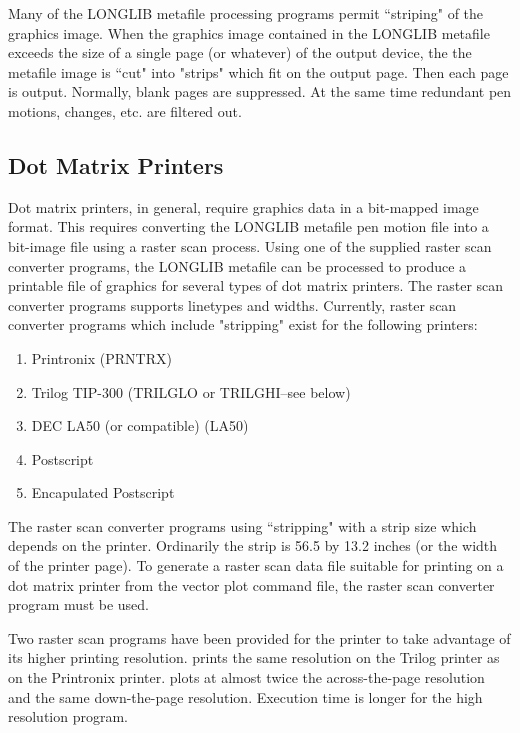 \documentclass[11pt]{report}
\begin{document}
Many of the LONGLIB metafile processing programs permit ``striping" of
the graphics image.  When the graphics image contained in the LONGLIB
metafile exceeds the size of a single page (or whatever) of the output
device, the the metafile image is ``cut" into "strips" which fit on
the output page.  Then each page is output.  Normally, blank pages are
suppressed.  At the same time redundant pen motions, changes, etc. are
filtered out.

\subsection{Dot Matrix Printers}

Dot matrix printers, in general, require graphics data in a bit-mapped
image format.  This requires converting the LONGLIB metafile pen
motion file into a bit-image file using a raster scan process.
Using one of the supplied raster scan converter programs, the LONGLIB
metafile can be processed to produce a printable file of graphics for
several types of dot matrix printers.  The raster scan converter programs
supports linetypes and widths.  Currently, raster scan
converter programs which include "stripping" exist for the following
printers:

\begin{enumerate}
\item Printronix (PRNTRX)
\item Trilog TIP-300 (TRILGLO or TRILGHI--see below)
\item DEC LA50 (or compatible) (LA50)
\item Postscript
\item Encapulated Postscript
\end{enumerate}

The raster scan converter programs using ``stripping" with a strip
size which depends on the printer.  Ordinarily the strip is 56.5 by
13.2 inches (or the width of the printer page).
To generate a raster scan data file suitable for printing on a
dot matrix printer from the vector plot command file, the
raster scan converter program must be used.

Two raster scan programs have been provided for the
 printer to take advantage of its higher printing resolution.
 prints the same resolution on the Trilog printer as on the
Printronix printer.   plots at almost twice the
across-the-page resolution and the same down-the-page resolution.
Execution time is longer for the high resolution program.
\end{document}
